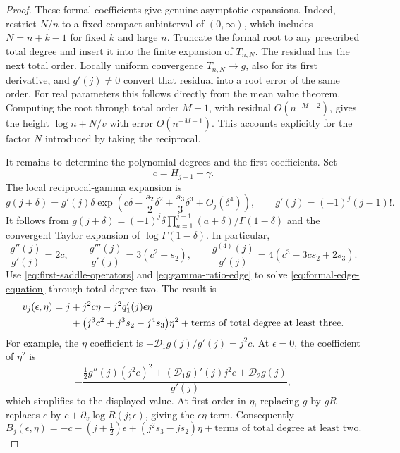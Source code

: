 \begin{proof}
These formal coefficients give genuine asymptotic expansions.
Indeed, restrict $N/n$ to a fixed compact subinterval of $(0,\infty)$,
which includes $N=n+k-1$ for fixed $k$ and large $n$.  Truncate the
formal root to any prescribed total degree and insert it into the
finite expansion of $T_{n,N}$.  The residual has the next total
order.  Locally uniform convergence $T_{n,N}\to g$, also for its
first derivative, and $g'(j)\ne0$ convert that residual into a root
error of the same order.  For real parameters this follows directly
from the mean value theorem.  Computing the root through total
order $M+1$, with residual $O(n^{-M-2})$, gives the height
$\log n+N/v$ with error $O(n^{-M-1})$.  This accounts explicitly
for the factor $N$ introduced by taking the reciprocal.

It remains to determine the polynomial degrees and the first
coefficients.  Set
\[
 c=H_{j-1}-\gamma.
\]
The local reciprocal-gamma expansion is
\begin{equation}\label{eq:reciprocal-gamma-at-integer}
 g(j+\delta)=g'(j)\delta
     \exp\left(c\delta-\frac{s_2}2\delta^2
                   +\frac{s_3}3\delta^3+O_j(\delta^4)\right),
 \qquad g'(j)=(-1)^j(j-1)!.
\end{equation}
It follows from
$g(j+\delta)=(-1)^j\delta\prod_{a=1}^{j-1}(a+\delta)/\Gamma(1-\delta)$
and the convergent Taylor expansion of $\log\Gamma(1-\delta)$.
In particular,
\[
 \frac{g''(j)}{g'(j)}=2c,\qquad
 \frac{g'''(j)}{g'(j)}=3(c^2-s_2),\qquad
 \frac{g^{(4)}(j)}{g'(j)}=4(c^3-3cs_2+2s_3).
\]
Use \eqref{eq:first-saddle-operators} and
\eqref{eq:gamma-ratio-edge} to solve
\eqref{eq:formal-edge-equation} through total degree two.  The result is
\begin{align}\label{eq:formal-reciprocal-root-two-terms}
 v_j(\epsilon,\eta)=j
   &+j^2c\eta+j^2q_1'(j)\epsilon\eta\\
   &+\bigl(j^3c^2+j^3s_2-j^4s_3\bigr)\eta^2
       +\text{terms of total degree at least three}.\notag
\end{align}
For example, the $\eta$ coefficient is
$-\mathcal D_1g(j)/g'(j)=j^2c$.  At $\epsilon=0$, the coefficient
of $\eta^2$ is
\[
 -\frac{\frac12g''(j)(j^2c)^2
      +(\mathcal D_1g)'(j)j^2c+\mathcal D_2g(j)}{g'(j)},
\]
which simplifies to the displayed value.  At first order in $\eta$,
replacing $g$ by $gR$ replaces $c$ by
$c+\partial_v\log R(j;\epsilon)$, giving the $\epsilon\eta$ term.
Consequently
\begin{equation}\label{eq:formal-height-first-coefficients}
 B_j(\epsilon,\eta)=-c
       -(j+\tfrac12)\epsilon+(j^2s_3-js_2)\eta
       +\text{terms of total degree at least two}.
\end{equation}


\end{proof}
